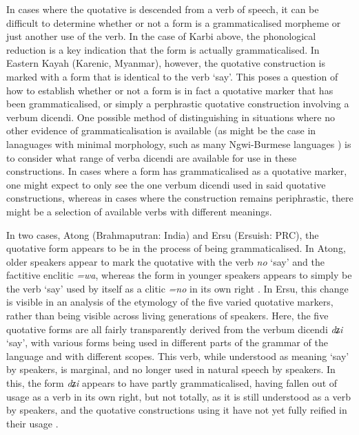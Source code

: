 In cases where the quotative is descended from a verb of speech, it can be difficult to determine whether or not a form is a grammaticalised morpheme or just another use of the verb. In the case of Karbi above, the phonological reduction is a key indication that the form is actually grammaticalised. In Eastern Kayah (Karenic, Myanmar), however, the quotative construction is marked with a form that is identical to the verb `say'. This poses a question of how to establish whether or not a form is in fact a quotative marker that has been grammaticalised, or simply a perphrastic quotative construction involving a verbum dicendi. One possible method of distinguishing in situations where no other evidence of grammaticalisation is available (as might be the case in lanaguages with minimal morphology, such as many Ngwi-Burmese languages ) is to consider what range of verba dicendi are available for use in these constructions. In cases where a form has grammaticalised as a quotative marker, one might expect to only see the one verbum dicendi used in said quotative constructions, whereas in cases where the construction remains periphrastic, there might be a selection of available verbs with different meanings.

In two cases, Atong (Brahmaputran: India) and Ersu (Ersuish: PRC), the quotative form appears to be in the process of being grammaticalised. In Atong, older speakers appear to mark the quotative with the verb \textit{no} `say' and the factitive enclitic \textit{=wa}, whereas the form in younger speakers appears to simply be the verb `say' used by itself as a clitic \textit{=no} in its own right \cite[408]{Breugel2014}. In Ersu, this change is visible in an analysis of the etymology of the five varied quotative markers, rather than being visible across living generations of speakers. Here, the five quotative forms are all fairly transparently derived from the verbum dicendi \textit{dʑi} `say', with various forms being used in different parts of the grammar of the language and with different scopes. This verb, while understood as meaning `say' by speakers, is marginal, and no longer used in natural speech by speakers. In this, the form \textit{dʑi} appears to have partly grammaticalised, having fallen out of usage as a verb in its own right, but not totally, as it is still understood as a verb by speakers, and the quotative constructions using it have not yet fully reified in their usage \cite{Zhang2014}.

